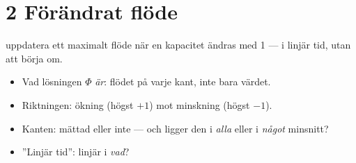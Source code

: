 \section{2 Förändrat flöde}

{uppdatera ett maximalt flöde när en kapacitet ändras med 1 — i linjär tid, utan att börja om.}
{\begin{itemize}\setlength{\itemsep}{1pt}
  \item Vad lösningen $\Phi$ \emph{är}: flödet på varje kant, inte bara värdet.
  \item Riktningen: ökning (högst $+1$) mot minskning (högst $-1$).
  \item Kanten: mättad eller inte — och ligger den i \emph{alla} eller i \emph{något} minsnitt?
  \item ”Linjär tid”: linjär i \emph{vad}?
\end{itemize}}



